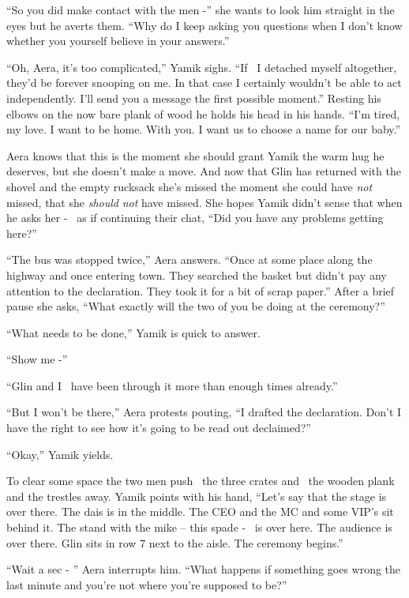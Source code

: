 \documentclass[twoside,11pt]{book}
\begin{document}
``So you did make contact with the men -'' she wants to look
him{ }straight in the eyes but he averts them. ``Why do I keep
asking you questions when I don't know whether you yourself believe in your answers.''

``Oh, Aera, it's too complicated,'' Yamik sighs. ``If \ I detached myself
altogether, they'd be forever snooping on{ }me. In that case I certainly wouldn't be able to act
independently. I'll send you a message the first possible moment.'' Resting his elbows on the now bare
plank of wood he holds his head in his hands. ``I'm tired, my love. I want to be home. With you. I want
us{ }to choose a name for our baby.''

Aera knows that this is the moment she should grant Yamik the warm hug he deserves, but she doesn't make a move. And now
that Glin has returned with the shovel and the empty rucksack she's missed the moment she could have \textit{not}
missed, that she \textit{should} \textit{not} have missed. She hopes Yamik didn't sense that when he asks her - \ as if
continuing their chat, ``Did you have any problems getting here?''

``The bus was stopped twice,'' Aera answers. ``Once at some place along the
highway and once entering town. They searched the basket but didn't pay any attention to the declaration. They took it
for a bit of scrap paper.'' After a brief pause she asks, ``What exactly will the two of you
be doing at the ceremony?''

``What needs to be done,'' Yamik is quick to answer.

``Show me -''

``Glin and I~ have been through it more than enough times already.''

``But I won't be there,'' Aera protests pouting, ``I drafted the declaration.
Don't I have the right to see how it's going to be read out declaimed?''

``Okay,'' Yamik yields.

To clear some space the two men push \ the three crates and \ the wooden plank and the trestles
away{.} Yamik points with his hand, ``Let's say that the stage is
over there. The dais is in the middle. The CEO and the MC and some VIP's sit behind it. The stand with the mike -- this
spade - ~is over here. The audience is over there. Glin sits in row 7 next to the aisle. The ceremony
begins.''

``Wait a sec - '' Aera interrupts him. ``What happens if something goes wrong the
last minute and you're not where you're supposed to be?''
\end{document}
